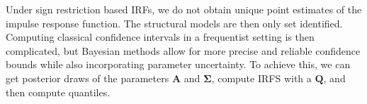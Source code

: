 Under sign restriction based IRFs, we do not obtain unique point estimates of the impulse response function. The structural models are then only set identified. Computing classical confidence intervals in a frequentist setting is then complicated, but Bayesian methods allow for more precise and reliable confidence bounds while also incorporating parameter uncertainty. To achieve this, we can get posterior draws of the parameters $\bm{A}$ and $\bm{\Sigma}$, compute IRFS with a $\bm{Q}$, and then compute quantiles.


